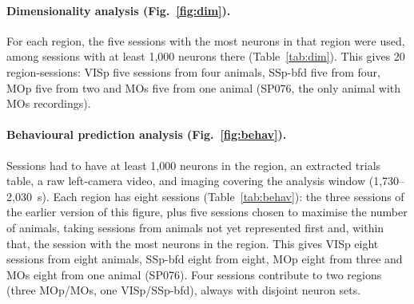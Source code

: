 \documentclass[11pt]{article}
\begin{document}
\paragraph{Dimensionality analysis (Fig.~\ref{fig:dim}).} For each region, the five sessions with the most neurons in that region were used, among sessions with at least 1,000 neurons there (Table~\ref{tab:dim}). This gives 20 region-sessions: VISp five sessions from four animals, SSp-bfd five from four, MOp five from two and MOs five from one animal (SP076, the only animal with MOs recordings).

\paragraph{Behavioural prediction analysis (Fig.~\ref{fig:behav}).} Sessions had to have at least 1,000 neurons in the region, an extracted trials table, a raw left-camera video, and imaging covering the analysis window (1,730--2,030~s). Each region has eight sessions (Table~\ref{tab:behav}): the three sessions of the earlier version of this figure, plus five sessions chosen to maximise the number of animals, taking sessions from animals not yet represented first and, within that, the session with the most neurons in the region. This gives VISp eight sessions from eight animals, SSp-bfd eight from eight, MOp eight from three and MOs eight from one animal (SP076). Four sessions contribute to two regions (three MOp/MOs, one VISp/SSp-bfd), always with disjoint neuron sets.
\end{document}
